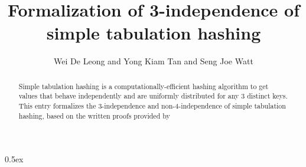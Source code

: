 \documentclass[11pt,a4paper]{article}
\begin{document}
\title{Formalization of 3-independence of simple tabulation hashing}
\author{Wei De Leong and Yong Kiam Tan and Seng Joe Watt}
\maketitle

\begin{abstract}
Simple tabulation hashing \cite{patrascu-2011} is a computationally-efficient hashing algorithm to get values that behave independently and are uniformly distributed for any 3 distinct keys.
This entry formalizes the 3-independence and non-4-independence of simple tabulation hashing, based on the written proofs provided by \cite[Solutions 8]{marecek-2023}\cite{wikipedia-contributors-2024-tabulation-hashing}
\end{abstract}


\tableofcontents

\parindent 0pt\parskip 0.5ex

\newpage




\end{document}
